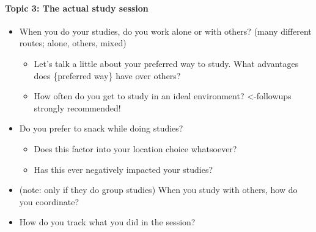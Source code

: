 \documentclass[a4paper,11pt]{article}
\begin{document}
\paragraph{Topic 3: The actual study session}%
\begin{itemize}
    \item When you do your studies, do you work alone or with others? (many different routes; alone, others, mixed)
    \begin{itemize}
        \item Let's talk a little about your preferred way to study. What advantages does \{preferred way\} have over others?
        \item How often do you get to study in an ideal environment? <-followups strongly recommended!
    \end{itemize}
    \item Do you prefer to snack while doing studies?
    \begin{itemize}
        \item Does this factor into your location choice whatsoever?
        \item Has this ever negatively impacted your studies?
    \end{itemize}
    \item (note: only if they do group studies) When you study with others, how do you coordinate?
    \item How do you track what you did in the session?
\end{itemize}
\end{document}
